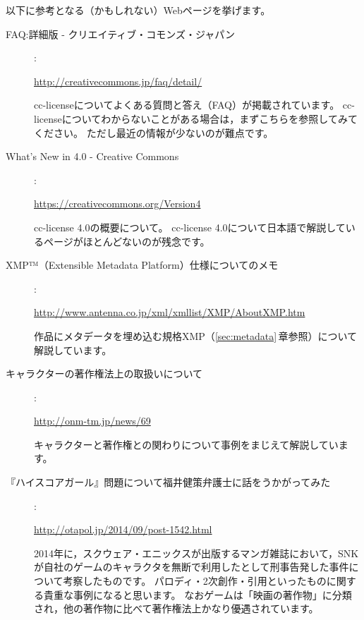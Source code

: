 \documentclass{ltjsarticle}
\begin{document}
以下に参考となる（かもしれない）Webページを挙げます。

\begin{description}

\item[FAQ:詳細版 - クリエイティブ・コモンズ・ジャパン] :\par
    \url{http://creativecommons.jp/faq/detail/}\par
    cc-licenseについてよくある質問と答え（FAQ）が掲載されています。
    cc-licenseについてわからないことがある場合は，まずこちらを参照してみてください。
    ただし最近の情報が少ないのが難点です。

\item[What's New in 4.0 - Creative Commons] :\par
    \url{https://creativecommons.org/Version4}\par
    cc-license 4.0の概要について。
    cc-license 4.0について日本語で解説しているページがほとんどないのが残念です。

\item[XMP™（Extensible Metadata Platform）仕様についてのメモ] :\par
    \url{http://www.antenna.co.jp/xml/xmllist/XMP/AboutXMP.htm}\par
    作品にメタデータを埋め込む規格XMP（\ref{sec:metadata}\,章参照）について解説しています。

\item[キャラクターの著作権法上の取扱いについて] :\par
    \url{http://onm-tm.jp/news/69}\par
    キャラクターと著作権との関わりについて事例をまじえて解説しています。

\item[『ハイスコアガール』問題について福井健策弁護士に話をうかがってみた] :\par
    \url{http://otapol.jp/2014/09/post-1542.html}\par
    2014年に，スクウェア・エニックスが出版するマンガ雑誌において，SNKが自社のゲームのキャラクタを無断で利用したとして刑事告発した事件について考察したものです。
    パロディ・2次創作・引用といったものに関する貴重な事例になると思います。
    なおゲームは「映画の著作物」に分類され，他の著作物に比べて著作権法上かなり優遇されています。

\end{description}


\nocite{Book:CCJP}\nocite{Book:NAWA-CR2}\nocite{Book:NOGUCHI-COPY}\nocite{Book:CHEN-FC}
\printbibliography[title=参考図書]
\end{document}
